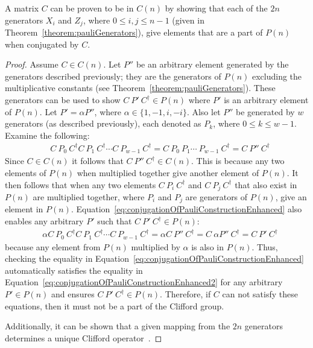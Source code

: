 \begin{theorem}
\label{theorem:proofForProvingGateIsClifford}
A matrix $C$ can be proven to be in $C(n)$ by showing that each of the $2n$ generators $X_i$ and $Z_j$, where $0 \leq i, j \leq n-1$ (given in Theorem~\ref{theorem:pauliGenerators}), give elements that are a part of $P(n)$ when conjugated by $C$. 
\end{theorem}
\begin{proof}
Assume $C \in C(n)$. Let $P''$ be an arbitrary element generated by the generators described previously; they are the generators of $P(n)$ excluding the multiplicative constants (see Theorem~\ref{theorem:pauliGenerators}). These generators can be used to show $C \ P' \ C^{\dagger} \in P(n)$ where $P'$ is an arbitrary element of $P(n)$. Let $P' = \alpha P''$, where $\alpha \in \{1, -1, i, -i\}$. Also let $P''$ be generated by $w$ generators (as described previously), each denoted as $P_k$, where $0 \leq k \leq w - 1$. Examine the following:
\begin{align}
\label{eq:conjugationOfPauliConstructionEnhanced}
&C \ P_0 \ C^{\dagger}C \ P_1 \ C^{\dagger}\cdots C \ P_{w-1} \ C^{\dagger} = C \ P_0 \ P_1 \cdots \ P_{w-1} \ C^{\dagger} = C \ P'' \ C^{\dagger}
\end{align}
Since $C \in C(n)$ it follows that $C \ P'' \ C^{\dagger} \in C(n)$. This is because any two elements of $P(n)$ when multiplied together give another element of $P(n)$. It then follows that when any two elements $C \ P_i \ C^{\dagger}$ and $C \ P_j \ C^{\dagger}$ that also exist in $P(n)$ are multiplied together, where $P_i$ and $P_j$ are generators of $P(n)$, give an element in $P(n)$. Equation~\eqref{eq:conjugationOfPauliConstructionEnhanced} also enables any arbitrary $P'$ such that $C \ P' \ C^{\dagger} \in P(n)$:
\begin{align}
\label{eq:conjugationOfPauliConstructionEnhanced2}
&\alpha C \ P_0 \ C^{\dagger}C \ P_1 \ C^{\dagger}\cdots C \ P_{w-1} \ C^{\dagger} = \alpha C \ P'' \ C^{\dagger} = C \ \alpha P'' \ C^{\dagger} = C \ P' \ C^{\dagger}
\end{align}
because any element from $P(n)$ multiplied by $\alpha$ is also in $P(n)$. Thus, checking the equality in Equation~\eqref{eq:conjugationOfPauliConstructionEnhanced} automatically satisfies the equality in Equation~\eqref{eq:conjugationOfPauliConstructionEnhanced2} for any arbitrary $P' \in P(n)$ and ensures $C \ P' \ C^{\dagger} \in P(n)$. Therefore, if $C$ can not satisfy these equations, then it must not be a part of the Clifford group.

Additionally, it can be shown that a given mapping from the $2n$ generators determines a unique Clifford operator~\cite{ozols2008clifford}.
\end{proof}

